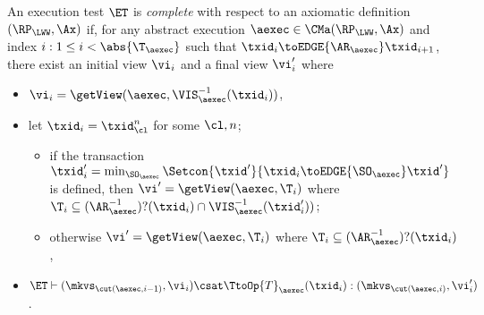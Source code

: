 \begin{definition}
\label{def:et_complete}
An execution test $\ET$ is \emph{complete} with respect 
to an axiomatic definition $(\RP_{\LWW}, \Ax)$ if, for any abstract execution $\aexec \in \CMa(\RP_{\LWW}, \Ax)$ 
and index \( i : 1 \leq i < \abs{\T_{\aexec}}\) such that \( \txid_{i} \toEDGE{\AR_{\aexec}} \txid_{i+1} \), there exist an initial view $\vi_{i}$ and a final view $\vi_{i}'$ where 
\begin{itemize}
\item $\vi_{i} = \getView(\aexec, \VIS_{\aexec}^{-1}(\txid_{i}))$, 
\item let $\txid_{i} = \txid_{\cl}^{n}$ for some $\cl, n$; 
    \begin{itemize}
        \item if the transaction $\txid_{i}' = \min_{\SO_{\aexec}}\Setcon{\txid' }{ \txid_i \toEDGE{\SO_{\aexec}} \txid'}$ is defined, then $\vi' = \getView(\aexec, \T_{i})$ where $\T_{i} \subseteq (\AR_{\aexec}^{-1})?(\txid_{i}) \cap \VIS_{\aexec}^{-1}(\txid_{i}'))$; 
        \item otherwise $\vi' = \getView(\aexec, \T_{i})$ where $\T_{i} \subseteq (\AR_{\aexec}^{-1})?(\txid_{i})$, 
    \end{itemize}
\item $\ET \vdash (\mkvs_{\cut(\aexec, i-1)}, \vi_{i}) \csat \TtoOp{T}_{\aexec}(\txid_{i}) : (\mkvs_{\cut(\aexec, i)},\vi_{i}')$.
\end{itemize}
\end{definition}

